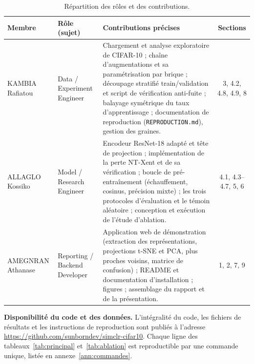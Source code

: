 \documentclass[11pt,a4paper]{article}
\newcommand{\membreKR}{KAMBIA Rafiatou}
\newcommand{\membreAK}{ALLAGLO Kossiko}
\newcommand{\membreAA}{AMEGNRAN Athanase}
\newcommand{\lienDepot}{https://github.com/sunborndev/simclr-cifar10}
\newcommand{\encadre}[1]{%
  \par\vspace{4pt}\noindent
  \colorbox{fondgris}{\parbox{\dimexpr\textwidth-2\fboxsep}{\small #1}}%
  \par\vspace{4pt}}
\begin{document}
\begin{table}[htbp]
\centering\small
\caption{Répartition des rôles et des contributions.}
\label{tab:repartition}
\begin{tabularx}{\textwidth}{@{}llXc@{}}
\toprule
\textbf{Membre} & \textbf{Rôle (sujet)} & \textbf{Contributions précises} & \textbf{Sections} \\
\midrule
\membreKR{} & Data / Experiment Engineer
& Chargement et analyse exploratoire de CIFAR-10 ; chaîne d'augmentations et sa
paramétrisation par brique ; découpage stratifié train/validation et script de vérification
anti-fuite ; balayage symétrique du taux d'apprentissage ; documentation de reproduction
(\texttt{REPRODUCTION.md}), gestion des graines.
& 3, 4.2, 4.8, 4.9, 8 \\
\addlinespace
\membreAK{} & Model / Research Engineer
& Encodeur ResNet-18 adapté et tête de projection ; implémentation de la perte NT-Xent et
de sa vérification ; boucle de pré-entraînement (échauffement, cosinus, précision mixte) ;
les trois protocoles d'évaluation et le témoin aléatoire ; conception et exécution de
l'étude d'ablation.
& 4.1, 4.3--4.7, 5, 6 \\
\addlinespace
\membreAA{} & Reporting / Backend Developer
& Application web de démonstration (extraction des représentations, projections t-SNE et
PCA, plus proches voisins, matrice de confusion) ; README et documentation d'installation ;
figures ; assemblage du rapport et de la présentation.
& 1, 2, 7, 9 \\
\bottomrule
\end{tabularx}
\end{table}

\vspace{4pt}
\encadre{\textbf{Disponibilité du code et des données.} L'intégralité du code, les fichiers
de résultats et les instructions de reproduction sont publiés à l'adresse
\url{\lienDepot}. Chaque ligne des tableaux~\ref{tab:principal} et~\ref{tab:ablation} est
reproductible par une commande unique, listée en annexe~\ref{ann:commandes}.}
\end{document}
